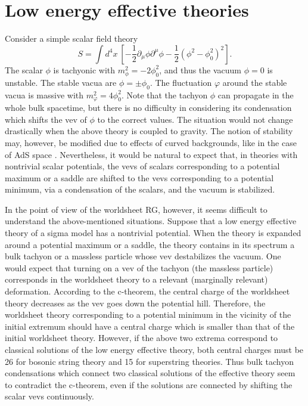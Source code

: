 \documentclass[a4paper,a4paper]{article}
\begin{document}
\vspace{1cm}

\section{Low energy effective theories}    \label{LEET}

\vspace{5mm}

Consider a simple scalar field theory
\begin{equation}
S = \int d^4x\ \left[ -\frac12\partial_\mu\phi\partial^\mu\phi-\frac12(\phi^2-\phi_0^2)^2 \right].
\end{equation}
The scalar $\phi$ is tachyonic with $m_\phi^2=-2\phi_0^2$, and thus the vacuum $\phi=0$ is unstable. 
The stable vacua are $\phi=\pm\phi_0$. 
The fluctuation $\varphi$ around the stable vacua is massive with $m_\varphi^2=4\phi_0^2$. 
Note that the tachyon $\phi$ can propagate in the whole bulk spacetime, but there is no difficulty in considering 
its condensation which shifts the vev of $\phi$ to the correct values. 
The situation would not change drastically when the above theory is coupled to gravity. 
The notion of stability may, however, be modified 
due to effects of curved backgrounds, like in the case of AdS space 
\cite{AdS}. 
Nevertheless, it would be natural to expect that, in theories with nontrivial scalar potentials, the vevs of 
scalars corresponding to a potential maximum or a saddle are shifted to the vevs corresponding to a potential 
minimum, via a condensation of the scalars, and the vacuum is stabilized. 

In the point of view of the worldsheet RG, however, 
it seems difficult to understand the above-mentioned situations. 
Suppose that a low energy effective theory of a sigma model has a nontrivial potential. 
When the theory is expanded around a potential maximum or a saddle, the theory contains in its spectrum a bulk 
tachyon or a massless particle whose vev destabilizes the vacuum. 
One would expect that turning on a vev of the tachyon (the massless particle) corresponds in the worldsheet 
theory to a relevant (marginally relevant) deformation. 
According to the c-theorem, the central charge of the worldsheet theory decreases as the vev goes down the 
potential hill. 
Therefore, the worldsheet theory corresponding to a potential minimum in the vicinity of the initial extremum 
should have a central charge which is 
smaller than that of the initial worldsheet theory. 
However, if the above two extrema correspond to classical solutions of the low energy effective theory, 
both central charges must be 26 for bosonic string theory and 15 for superstring theories. 
Thus bulk tachyon condensations which connect two classical solutions of the effective theory seem to contradict 
the c-theorem, even if the solutions are connected by shifting the scalar vevs continuously. 
\end{document}
